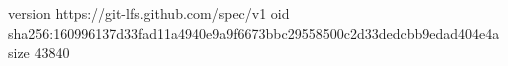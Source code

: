 version https://git-lfs.github.com/spec/v1
oid sha256:160996137d33fad11a4940e9a9f6673bbc29558500c2d33dedcbb9edad404e4a
size 43840
